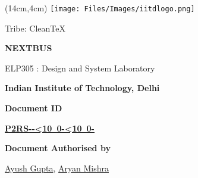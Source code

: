 \renewcommand{\thefootnote}{\alph{footnote}}
\def\mydate{\leavevmode\hbox{\the\year-\twodigits\month-\twodigits\day}}
\def\twodigits#1{\ifnum#1<10 0\fi\the#1}
\begin{titlepage}

       \begin{textblock*}{2cm}(14cm,4cm)
       \texttt{[image: Files/Images/iitdlogo.png]}
       \end{textblock*}
            \vskip1in
	        \raggedright
            \vskip3in
              {%
				\fontsize{20}{28}
				\boldmath
				\sffamily
				 Tribe: CleanTeX
				\par
            }
             \vskip0.2in
           
             {
				\Large
				\fontsize{28}{32}
				\bfseries
				\boldmath
				\sffamily
                NEXTBUS
				\par
            }
            \vskip0.1in
             {
				\fontsize{18}{18}
				\sffamily
                
				\par
            }
            \vskip0.1in
             {
				\fontsize{16}{16}
				\sffamily
                ELP305 : Design and System Laboratory
				\par
            }
            \vskip0.1in
             {
				\fontsize{16}{14}
				\sffamily
                \textbf{Indian Institute of Technology, Delhi}
                \par
            }
    \vspace{0.85in}
    {
        \normalsize
        \sffamily
        \textbf{\textcolor{tuberlindarkgray}{Document ID}}\par \vspace{0.12cm}
                \hyperlink{Target_DocInfo}{\textbf{P2RS-\mydate-}}\par
                \vspace{0.24cm}  
        \textbf{\textcolor{tuberlindarkgray}{Document Authorised by}}\par \vspace{0.12cm}
        {\href{https://www.linkedin.com/in/ayush-gupta-undergraduate/}{Ayush Gupta}, \href{http://linkedin.com/in/aryan-mishra-04j}{Aryan Mishra}}

}
\end{titlepage}
